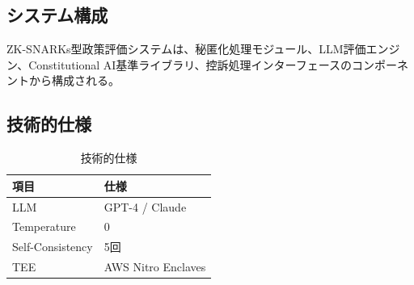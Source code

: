 \subsection{システム構成}

ZK-SNARKs型政策評価システムは、秘匿化処理モジュール、LLM評価エンジン、Constitutional AI基準ライブラリ、控訴処理インターフェースのコンポーネントから構成される。

\subsection{技術的仕様}

\begin{table}[htbp]
\centering
\caption{技術的仕様}
\begin{tabular}{ll}
\toprule
項目 & 仕様 \\
\midrule
LLM & GPT-4 / Claude \\
Temperature & 0 \\
Self-Consistency & 5回 \\
TEE & AWS Nitro Enclaves \\
\bottomrule
\end{tabular}
\end{table}

